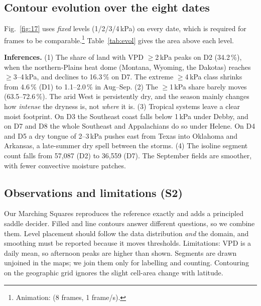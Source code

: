 \subsection{Contour evolution over the eight dates}
Fig.~\ref{fig:17} uses \emph{fixed} levels (1/2/3/4\,kPa) on every date, which is required for frames to be
comparable.\footnote{Animation:  (8 frames, 1 frame/s).}
Table~\ref{tab:evol} gives the area above each level.



\textbf{Inferences.}
(1) The share of land with VPD $\ge$2\,kPa peaks on D2 (34.2\,\%), when the northern-Plains heat dome (Montana, Wyoming,
the Dakotas) reaches $\ge$3--4\,kPa, and declines to 16.3\,\% on D7. The extreme $\ge$4\,kPa class shrinks from 4.6\,\% (D1)
to 1.1--2.0\,\% in Aug--Sep.
(2) The $\ge$1\,kPa share barely moves (63.5--72.6\,\%). The arid West is persistently dry, and the season mainly changes
how \emph{intense} the dryness is, not \emph{where} it is.
(3) Tropical systems leave a clear moist footprint. On D3 the Southeast coast falls below 1\,kPa under Debby, and on D7 and D8
the whole Southeast and Appalachians do so under Helene. On D4 and D5 a dry tongue of 2--3\,kPa pushes east from Texas into
Oklahoma and Arkansas, a late-summer dry spell between the storms.
(4) The isoline segment count falls from 57,087 (D2) to 36,559 (D7). The September fields are smoother, with fewer
convective moisture patches.

\subsection{Observations and limitations (S2)}
Our Marching Squares reproduces the reference exactly and adds a principled saddle decider. Filled and line contours
answer different questions, so we combine them. Level placement should follow the data distribution \emph{and} the
domain, and smoothing must be reported because it moves thresholds. Limitations: VPD is a daily mean, so afternoon peaks are
higher than shown. Segments are drawn unjoined in the maps; we join them only for labelling and counting. Contouring on the
geographic grid ignores the slight cell-area change with latitude.
